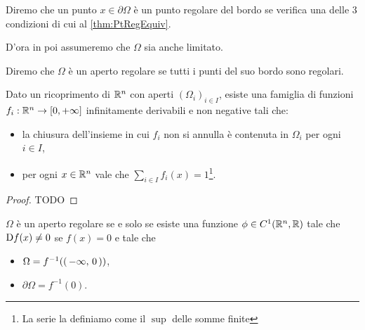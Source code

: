 \begin{definition}
	Diremo che un punto $x\in \partial \Omega$ è un punto regolare del bordo se verifica una delle $3$ condizioni di cui
	al \cref{thm:PtRegEquiv}.
\end{definition}

D'ora in poi assumeremo che $\Omega$ sia anche limitato.

\begin{definition}
	Diremo che $\Omega$ è un aperto regolare se tutti i punti del suo bordo sono regolari.
\end{definition}


\begin{theorem}\label{thm:PartizioneUnita}
	Dato un ricoprimento di $\mathbb R^n$ con aperti $(\Omega_i)_{i\in I}$, esiste una famiglia di funzioni $f_i:\mathbb R^n\to[0,+\infty]$ infinitamente derivabili
	e non negative tali che:
	\begin{itemize}
		\item la chiusura dell'insieme in cui $f_i$ non si annulla è contenuta in $\Omega_i$ per ogni $i\in I$,
		\item per ogni $x\in\mathbb R^n$ vale che $\sum_{i\in I} f_i(x)=1$\footnote{La serie la definiamo come il $\sup$ delle somme finite}.
	\end{itemize}
\end{theorem}
\begin{proof}
	TODO
\end{proof}

\begin{lemma}\label{lem:EquivRegolare}
	$\Omega$ è un aperto regolare se e solo se esiste una funzione $\phi\in C^1(\mathbb R^n,\mathbb R)$ tale che $\mathrm D f(x)\neq 0$ se $f(x)=0$ e tale che
	\begin{itemize}
		\item $\Omega = f^{-1}(\left(\,-\infty,\,0\,\right))$,
		\item $\partial \Omega = f^{-1}(0)$.
	\end{itemize}
\end{lemma}

